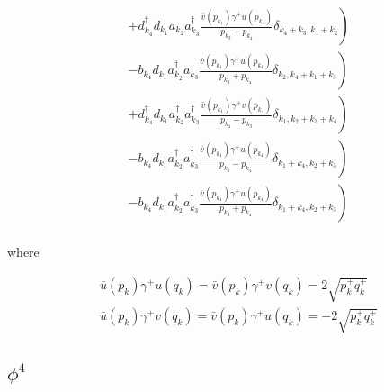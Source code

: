 \begin{align*}
     & \left. +d_{k_4}^\dagger d_{k_1} a_{k_2}a_{k_3}^\dagger \frac{\bar v(p_{k_1})\gamma^+u(p_{k_4})}{p_{k_3} + p_{k_4}}\delta_{k_4 + k_3, k_1 + k_2}\right)  \\
     & \left.-b_{k_4} d_{k_1} a_{k_2}^\dagger a_{k_3} \frac{\bar v(p_{k_1})\gamma^+u(p_{k_4})}{p_{k_3} + p_{k_4}}\delta_{k_2, k_4 + k_1 + k_3}\right)  \\
     & \left.+d_{k_4}^\dagger d_{k_1} a_{k_2 }^\dagger a_{k_3}^\dagger \frac{\bar v(p_{k_1})\gamma^+v(p_{k_4})}{p_{k_4} - p_{k_3}}\delta_{k_1, k_2 + k_3 + k_4}\right)  \\
     & \left.-b_{k_4} d_{k_1} a_{k_2}^\dagger a_{k_3}^\dagger \frac{\bar v(p_{k_1})\gamma^+u(p_{k_4})}{p_{k_3} - p_{k_4}}\delta_{k_1 + k_4, k_2 + k_3 }\right)  \\
     & \left.-b_{k_4} d_{k_1} a_{k_2}^\dagger a_{k_3}^\dagger \frac{\bar v(p_{k_1})\gamma^+u(p_{k_4})}{p_{k_3} + p_{k_4}}\delta_{k_1 + k_4, k_2 + k_3}\right)  \\
\end{align*}

where 

\begin{align}
    &\bar u(p_k)\gamma^+ u(q_k) = \bar v(p_k)\gamma^+ v(q_k) = 2\sqrt{p_k^+ q_k^+}\\
    &\bar u(p_k)\gamma^+ v(q_k) = \bar v(p_k)\gamma^+ u(q_k) = -2\sqrt{p_k^+ q_k^+}
\end{align}

\subsection{$\phi^4$}
